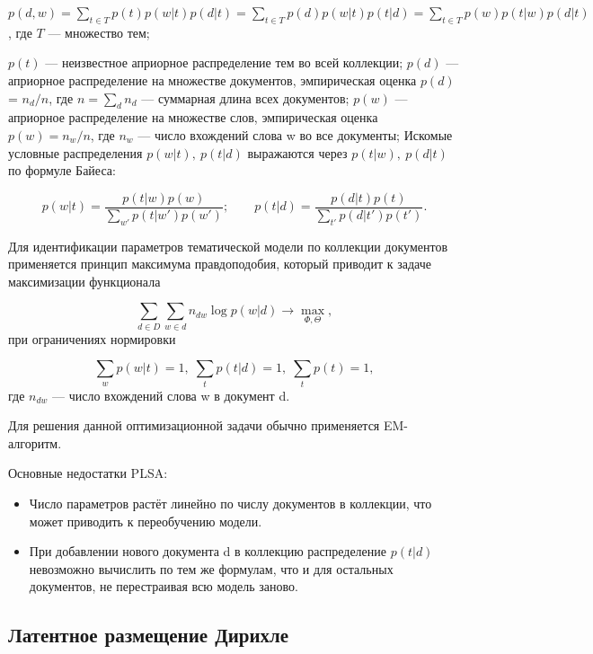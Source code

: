 \documentclass[a4paper,12pt,preview]{report} %
\begin{document}
	$p(d,w) = \sum_{t\in T} p(t) p(w|t) p(d|t) = \sum_{t\in T} p(d) p(w|t) p(t|d) = \sum_{t\in T} p(w) p(t|w) p(d|t)$,
	где $T$ — множество тем;
	
	$p(t)$ — неизвестное априорное распределение тем во всей коллекции;
	$p(d)$ — априорное распределение на множестве документов, эмпирическая оценка $p(d)$ = $n_d/n$, где $n = \sum_d n_d$ — суммарная длина всех документов;
	$p(w)$ — априорное распределение на множестве слов, эмпирическая оценка $p(w) = n_w/n$, где $n_w$ — число вхождений слова w во все документы;
	Искомые условные распределения $ p(w|t),\: p(t|d) $ выражаются через $ p(t|w),\: p(d|t) $ по формуле Байеса:
	
	\begin{equation}
	p(w|t) = \frac{p(t|w)p(w)}{\sum_{w'} p(t|w')p(w')};\qquad  p(t|d) = \frac{p(d|t)p(t)}{\sum_{t'} p(d|t')p(t')}.
	\end{equation}
	
	Для идентификации параметров тематической модели по коллекции документов применяется принцип максимума правдоподобия, который приводит к задаче максимизации функционала
	
	\begin{equation}
	\sum_{d\in D} \sum_{w\in d} n_{dw}\log p(w|d) \to \max_{\Phi,\Theta} ,
	\end{equation}
	при ограничениях нормировки
	
	\begin{equation}
	\sum_w p(w|t) = 1,\; \sum_t p(t|d) = 1,\; \sum_t p(t) = 1,
	\end{equation}
	где $n_{dw}$ — число вхождений слова w в документ d.
	
	Для решения данной оптимизационной задачи обычно применяется EM-алгоритм.
	
	Основные недостатки PLSA:
	
	\begin{itemize}
	\item Число параметров растёт линейно по числу документов в коллекции, что может приводить к переобучению модели.
	\item При добавлении нового документа d в коллекцию распределение $p(t|d)$ невозможно вычислить по тем же формулам, что и для остальных документов, не перестраивая всю модель заново.
	\end{itemize}
	
	
	
	\subsection{Латентное размещение Дирихле}
	
\end{document}
